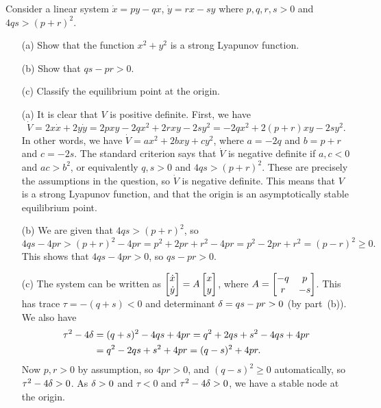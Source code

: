 \documentclass[a4paper]{amsart}
\begin{document}
\begin{exercise}\label{ex-lyapunov-linear}
 Consider a linear system $\dot{x}=py-qx$,\; $\dot{y}=rx-sy$ where
 $p,q,r,s>0$ and $4qs>(p+r)^2$.
 \begin{itemize}
  \item[(a)] Show that the function $x^2+y^2$ is a strong Lyapunov
   function.
  \item[(b)] Show that $qs-pr>0$.
  \item[(c)] Classify the equilibrium point at the origin.
 \end{itemize}
\end{exercise}
\begin{solution}\leavevmode
 \begin{itemize}
  \item[(a)] It is clear that $V$ is positive definite.  First, we have 
   \[ \dot{V} = 2x\dot{x} + 2y\dot{y} = 
       2pxy - 2qx^2 + 2rxy -2sy^2 = 
       -2qx^2 + 2(p+r)xy - 2sy^2.
   \]
   In other words, we have $\dot{V}=ax^2+2bxy+cy^2$, where $a=-2q$ and
   $b=p+r$ and $c=-2s$.  The standard criterion says that $\dot{V}$ is
   negative definite if $a,c<0$ and $ac>b^2$, or equivalently $q,s>0$
   and $4qs>(p+r)^2$.  These are precisely the assumptions in the
   question, so $\dot{V}$ is negative definite.  This means that $V$
   is a strong Lyapunov function, and that the origin is an
   asymptotically stable equilibrium point.
  \item[(b)] We are given that $4qs>(p+r)^2$, so 
   \[ 4qs - 4pr > (p+r)^2 - 4pr = p^2 + 2pr + r^2 - 4pr =
       p^2 - 2pr + r^2 = (p-r)^2 \geq 0.
   \]
   This shows that $4qs-4pr>0$, so $qs-pr>0$.
  \item[(c)] The system can be written as
   $\bbm\dot{x}\\ \dot{y}\ebm = A \bbm x \\ y \ebm$, where 
   $A=\bbm -q&p \\ r&-s\ebm$.  This has trace $\tau=-(q+s)<0$ and
   determinant $\dl=qs-pr>0$ (by part~(b)).  We also have 
   \begin{align*}
    \tau^2-4\dl &= (q+s)^2 - 4qs + 4pr = q^2 + 2qs + s^2 - 4qs + 4pr\\
     &= q^2 - 2qs + s^2 + 4pr = (q-s)^2 + 4pr.
   \end{align*}
   Now $p,r>0$ by assumption, so $4pr>0$, and $(q-s)^2\geq 0$
   automatically, so $\tau^2-4\dl>0$.  As $\dl>0$ and $\tau<0$ and
   $\tau^2-4\dl>0$, we have a stable node at the origin.
   \begin{center}
    \begin{tikzpicture}[scale=2.5]

\end{tikzpicture}
\end{center}
\end{itemize}
\end{solution}
\end{document}
